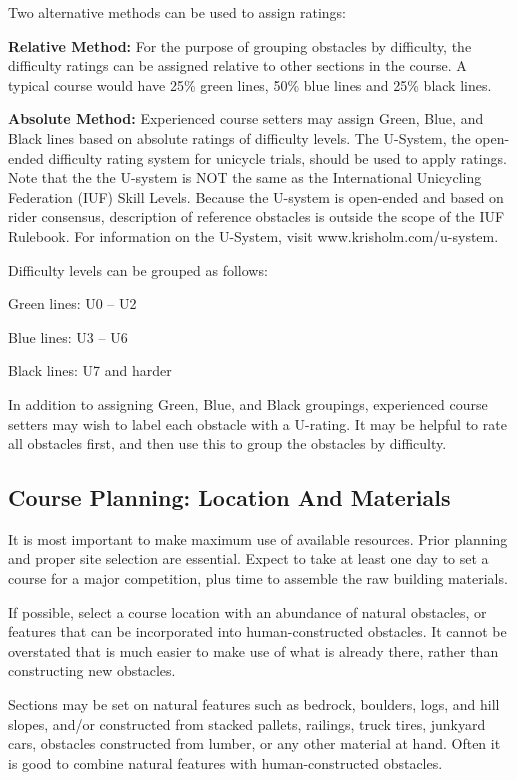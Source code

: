 Two alternative methods can be used to assign ratings:

\textbf{Relative Method:}
For the purpose of grouping obstacles by difficulty, the difficulty ratings can be assigned relative to other sections in the course. A typical course would have 25\% green lines, 50\% blue lines and 25\% black lines.

\textbf{Absolute Method:}
Experienced course setters may assign Green, Blue, and Black lines based on absolute ratings of difficulty levels.
The U-System, the open-ended difficulty rating system for unicycle trials, should be used to apply ratings.
Note that the the U-system is NOT the same as the International Unicycling Federation (IUF) Skill Levels.
Because the U-system is open-ended and based on rider consensus, description of reference obstacles is outside the scope of the IUF Rulebook.
For information on the U-System, visit www.krisholm.com/u-system.

Difficulty levels can be grouped as follows:

Green lines: U0 – U2

Blue lines: U3 – U6 

Black lines: U7 and harder

In addition to assigning Green, Blue, and Black groupings, experienced course setters may wish to label each obstacle with a U-rating.
It may be helpful to rate all obstacles first, and then use this to group the obstacles by difficulty.

\subsection{Course Planning: Location And Materials}
It is most important to make maximum use of available resources. 
Prior planning and proper site selection are essential.
Expect to take at least one day to set a course for a major competition, plus time to assemble the raw building materials.

If possible, select a course location with an abundance of natural obstacles, or features that can be incorporated into human-constructed obstacles. 
It cannot be overstated that is much easier to make use of what is already there, rather than constructing new obstacles.

Sections may be set on natural features such as bedrock, boulders, logs, and hill slopes, and/or constructed from stacked pallets, railings, truck tires, junkyard cars, obstacles constructed from lumber, or any other material at hand. 
Often it is good to combine natural features with human-constructed obstacles.

